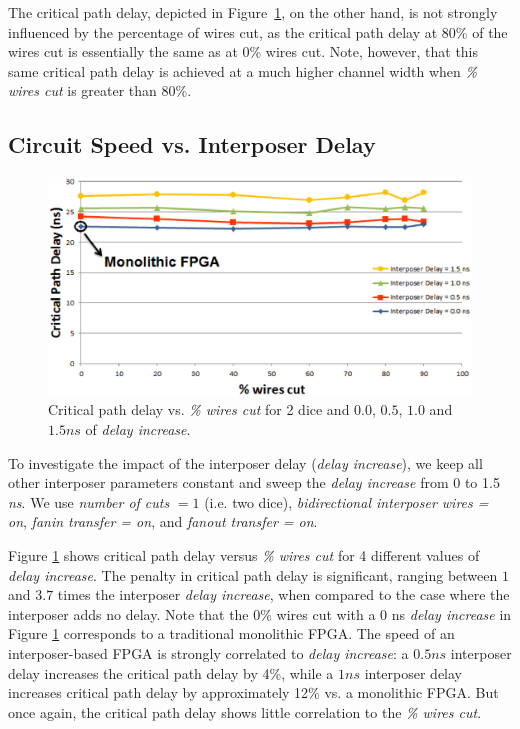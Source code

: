 \documentclass[journal]{IEEEtran}
\begin{document}
The critical path delay, depicted in Figure~\ref{fig:delays_crit}, on the other hand, is not strongly influenced by the percentage of wires cut, as the critical path delay at 80\% of the wires cut is essentially the same as at 0\% wires cut. Note, however, that this same critical path delay is achieved at a much higher channel width when \textit{\% wires cut} is greater than 80\%.

\subsection{Circuit Speed vs. Interposer Delay}

\begin{figure}[!b]
\centering
\includegraphics[width=\linewidth]{delays_crit_path_new.eps}
\caption{Critical path delay vs. \textit{\% wires cut} for 2 dice and $0.0$, $0.5$, $1.0$ and $1.5ns$ of \textit{delay increase}.}
\label{fig:delays_crit}
\end{figure}

To investigate the impact of the interposer delay (\textit{delay increase}), we keep all other interposer parameters constant and sweep the \textit{delay increase} from 0 to 1.5 \textit{ns}. We use \textit{number of cuts} $= 1$ (i.e. two dice), \textit{bidirectional interposer wires = on}, \textit{fanin transfer = on}, and \textit{fanout transfer = on}.

Figure \ref{fig:delays_crit} shows critical path delay versus \textit{\% wires cut} for 4 different values of \textit{delay increase}. The penalty in critical path delay is significant, ranging between $1$ and $3.7$ times the interposer \textit{delay increase}, when compared to the case where the interposer adds no delay. Note that the 0\% wires cut with a 0 ns \textit{delay increase} in Figure \ref{fig:delays_crit} corresponds to a traditional monolithic FPGA. The speed of an interposer-based FPGA is strongly correlated to \textit{delay increase}: a $0.5ns$ interposer delay increases the critical path delay by 4\%, while a $1ns$ interposer delay increases critical path delay by approximately 12\% vs. a monolithic FPGA. But once again, the critical path delay shows little correlation to the \textit{\% wires cut}.
\end{document}
